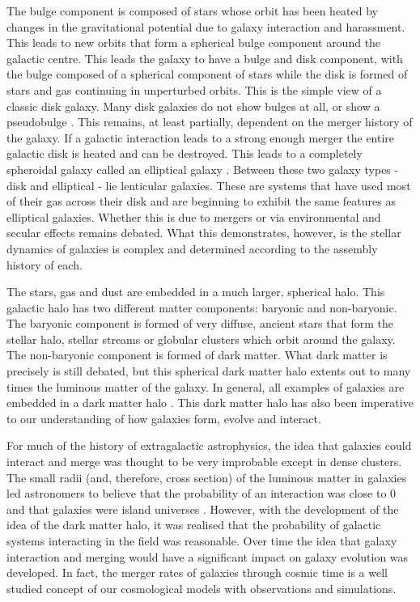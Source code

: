 The bulge component is composed of stars whose orbit has been heated by changes in the gravitational potential due to galaxy interaction and harassment. This leads to new orbits that form a spherical bulge component around the galactic centre. This leads the galaxy to have a bulge and disk component, with the bulge composed of a spherical component of stars while the disk is formed of stars and gas continuing in unperturbed orbits. This is the simple view of a classic disk galaxy. Many disk galaxies do not show bulges at all, or show a pseudobulge \citep{2009MNRAS.399..621G}. This remains, at least partially, dependent on the merger history of the galaxy. If a galactic interaction leads to a strong enough merger the entire galactic disk is heated and can be destroyed. This leads to a completely spheroidal galaxy called an elliptical galaxy \citep{1977egsp.conf..401T, 2006MNRAS.366..499D}. Between these two galaxy types - disk and elliptical - lie lenticular galaxies. These are systems that have used most of their gas across their disk and are beginning to exhibit the same features as elliptical galaxies. Whether this is due to mergers \citep{2004ApJ...616..192C, 2005ApJ...621..246B} or via environmental and secular effects \citep{2002MNRAS.330..251M, 2018MNRAS.476.2137R} remains debated. What this demonstrates, however, is the stellar dynamics of galaxies is complex and determined according to the assembly history of each.

The stars, gas and dust are embedded in a much larger, spherical halo. This galactic halo has two different matter components: baryonic and non-baryonic. The baryonic component is formed of very diffuse, ancient stars that form the stellar halo, stellar streams or globular clusters which orbit around the galaxy. The non-baryonic component is formed of dark matter. What dark matter is precisely is still debated, but this spherical dark matter halo extents out to many times the luminous matter of the galaxy. In general, all examples of galaxies are embedded in a dark matter halo \cite[although there are some debated exceptions as described in][]{2018Natur.555..629V}. This dark matter halo has also been imperative to our understanding of how galaxies form, evolve and interact.

For much of the history of extragalactic astrophysics, the idea that galaxies could interact and merge was thought to be very improbable except in dense clusters. The small radii (and, therefore, cross section) of the luminous matter in galaxies led astronomers to believe that the probability of an interaction was close to 0 and that galaxies were island universes \citep{1926ApJ....64..321H}. However, with the development of the idea of the dark matter halo, it was realised that the probability of galactic systems interacting in the field was reasonable. Over time the idea that galaxy interaction and merging would have a significant impact on galaxy evolution was developed. In fact, the merger rates of galaxies through cosmic time is a well studied concept of our cosmological models with observations and simulations.

